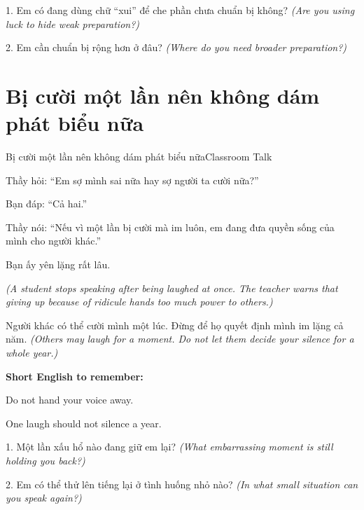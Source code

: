 \begin{tuhocnhanh}
1. Em có đang dùng chữ ``xui'' để che phần chưa chuẩn bị không? \textit{(Are you using luck to hide weak preparation?)}

2. Em cần chuẩn bị rộng hơn ở đâu? \textit{(Where do you need broader preparation?)}
\end{tuhocnhanh}
\ngancach

\section{Bị cười một lần nên không dám phát biểu nữa}
\begin{truyen}{Bị cười một lần nên không dám phát biểu nữa}{Classroom Talk}

Thầy hỏi: ``Em sợ mình sai nữa hay sợ người ta cười nữa?''

Bạn đáp: ``Cả hai.''

Thầy nói: ``Nếu vì một lần bị cười mà im luôn, em đang đưa quyền sống của mình cho người khác.''

Bạn ấy yên lặng rất lâu.

\textit{(A student stops speaking after being laughed at once. The teacher warns that giving up because of ridicule hands too much power to others.)}
\end{truyen}

\begin{baihoc}
Người khác có thể cười mình một lúc. Đừng để họ quyết định mình im lặng cả năm.
\textit{(Others may laugh for a moment. Do not let them decide your silence for a whole year.)}
\end{baihoc}

\begin{ghinhoanh}
\textbf{Short English to remember:}

Do not hand your voice away.

One laugh should not silence a year.
\end{ghinhoanh}

\begin{tuhocnhanh}
1. Một lần xấu hổ nào đang giữ em lại? \textit{(What embarrassing moment is still holding you back?)}

2. Em có thể thử lên tiếng lại ở tình huống nhỏ nào? \textit{(In what small situation can you speak again?)}
\end{tuhocnhanh}
\ngancach

